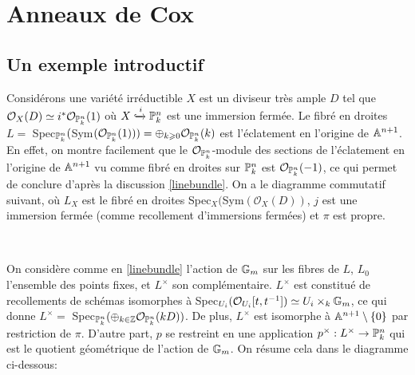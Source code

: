 \chapter{Anneaux de Cox}

\section{Un exemple introductif}




Considérons une variété irréductible $X$ est un diviseur très ample $D$ tel que $\mathcal{O}_X(D)\simeq i^*\mathcal{O}_{\mathbb{P}^n_k}(1)$ où $X\xhookrightarrow{i}\mathbb{P}^n_k $ est une immersion fermée. Le fibré en droites $L=$ Spec$_{\mathbb{P}^n_k}($Sym$(\mathcal{O}_{\mathbb{P}^n_k}(1))) = \oplus_{k\geqslant 0}\mathcal{O}_{\mathbb{P}^n_k}(k)$ est l'éclatement en l'origine de $\mathbb{A}^{n+1}$. En effet, on montre facilement que le $\mathcal{O}_{\mathbb{P}^n_k}$-module des sections de l'éclatement en l'origine de $\mathbb{A}^{n+1}$ vu comme fibré en droites sur $\mathbb{P}_k^n$ est $ \mathcal{O}_{\mathbb{P}^n_k}(-1)$, ce qui permet de conclure d'après la discussion \ref{linebundle}. On a le diagramme commutatif suivant, où $L_X$ est le fibré en droites Spec$_X($Sym$(\mathcal{O}_X(D))$, $j$ est une immersion fermée (comme recollement d'immersions fermées) et $\pi$ est propre.

	\begin{center}
	\\
	\end{center}


On considère comme en \ref{linebundle} l'action de $\mathbb{G}_m$ sur les fibres de $L$, $L_0$ l'ensemble des points fixes, et $L^\times$ son complémentaire. $L^\times$ est constitué de recollements de schémas isomorphes à Spec$_{U_i}( \mathcal{O}_{U_i}[t,t^{-1}])\simeq U_i \times_k \mathbb{G}_m$, ce qui donne $L^\times=$ Spec$_{\mathbb{P}^n_k}(\oplus_{k\in \mathbb{Z}}\mathcal{O}_{\mathbb{P}^n_k}(kD))$. De plus, $L^\times$ est isomorphe à $\mathbb{A}^{n+1}\setminus\lbrace 0 \rbrace$ par restriction de $\pi$. D'autre part, $p$ se restreint en une application $p^\times:L^\times \rightarrow \mathbb{P}^n_k$ qui est le quotient géométrique de l'action de $\mathbb{G}_m$. On résume cela dans le diagramme ci-dessous:

	\begin{center}
	\\
	\end{center}

